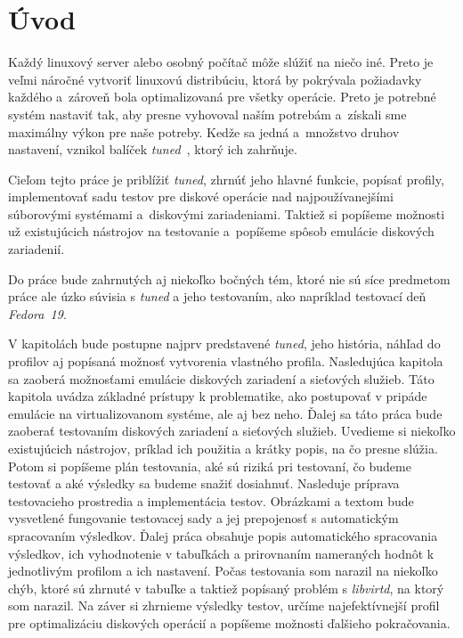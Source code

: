 %
%

\chapter{Úvod}

Každý linuxový server alebo osobný počítač môže slúžiť na niečo iné. Preto je
veľmi náročné vytvoriť linuxovú distribúciu, ktorá by pokrývala požiadavky
každého a~zároveň bola optimalizovaná pre všetky operácie. Preto je potrebné systém
nastaviť tak, aby presne vyhovoval naším potrebám a~získali sme maximálny výkon
pre naše potreby. Kedže sa jedná a~množstvo druhov nastavení, vznikol balíček
\emph{tuned}~\cite{tunedHomepage}, ktorý ich zahrňuje.

Cieľom tejto práce je priblížiť \emph{tuned}, zhrnúť jeho hlavné funkcie,
popísať profily, implementovať sadu testov pre diskové operácie nad
najpoužívanejšími súborovými systémami a~diskovými zariadeniami. Taktiež si
popíšeme možnosti už existujúcich nástrojov na testovanie a~popíšeme spôsob
emulácie diskových zariadenií.

Do práce bude zahrnutých aj niekoľko bočných tém, ktoré nie sú síce predmetom
práce ale úzko súvisia s \emph{tuned} a jeho testovaním, ako napríklad
testovací deň \emph{Fedora~19}.

V kapitolách bude postupne najprv predstavené \emph{tuned}, jeho história,
náhľad do profilov aj popísaná možnosť vytvorenia vlastného profila.
Nasledujúca kapitola sa zaoberá možnosťami emulácie diskových zariadení a
sieťových služieb. Táto kapitola uvádza základné prístupy k problematike, ako
postupovať v pripáde emulácie na virtualizovanom systéme, ale aj bez neho.
Ďalej sa táto práca bude zaoberať testovaním diskových zariadení a sieťových
služieb. Uvedieme si niekoľko existujúcich nástrojov, príklad ich použitia a
krátky popis, na čo presne slúžia. Potom si popíšeme plán testovania, aké sú
riziká pri testovaní, čo budeme testovať a aké výsledky sa budeme snažiť
dosiahnuť. Nasleduje príprava testovacieho prostredia a implementácia testov.
Obrázkami a textom bude vysvetlené fungovanie testovacej sady a jej prepojenosť
s automatickým spracovaním výsledkov. Ďalej práca obsahuje popis automatického
spracovania výsledkov, ich vyhodnotenie v tabuľkách a prirovnaním nameraných
hodnôt k jednotlivým profilom a ich nastavení. Počas testovania som narazil na
niekoľko chýb, ktoré sú zhrnuté v tabuľke a taktiež popísaný problém s
\emph{libvirtd}, na ktorý som narazil. Na záver si zhrnieme výsledky testov,
určíme najefektívnejší profil pre optimalizáciu diskových operácií a popíšeme
možnosti ďalšieho pokračovania.

